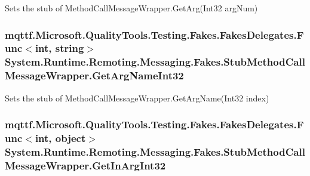 Sets the stub of Method\-Call\-Message\-Wrapper.\-Get\-Arg(\-Int32 arg\-Num)

\hypertarget{class_system_1_1_runtime_1_1_remoting_1_1_messaging_1_1_fakes_1_1_stub_method_call_message_wrapper_a0bc601441032eaa9484d346543abc3eb}{
\subsubsection[{Get\-Arg\-Name\-Int32}]{\setlength{\rightskip}{0pt plus 5cm}mqttf.\-Microsoft.\-Quality\-Tools.\-Testing.\-Fakes.\-Fakes\-Delegates.\-Func$<$int, string$>$ System.\-Runtime.\-Remoting.\-Messaging.\-Fakes.\-Stub\-Method\-Call\-Message\-Wrapper.\-Get\-Arg\-Name\-Int32}}\label{class_system_1_1_runtime_1_1_remoting_1_1_messaging_1_1_fakes_1_1_stub_method_call_message_wrapper_a0bc601441032eaa9484d346543abc3eb}


Sets the stub of Method\-Call\-Message\-Wrapper.\-Get\-Arg\-Name(\-Int32 index)

\hypertarget{class_system_1_1_runtime_1_1_remoting_1_1_messaging_1_1_fakes_1_1_stub_method_call_message_wrapper_ac3873c0ed7ba419030b9f453f2cfd1d2}{
\subsubsection[{Get\-In\-Arg\-Int32}]{\setlength{\rightskip}{0pt plus 5cm}mqttf.\-Microsoft.\-Quality\-Tools.\-Testing.\-Fakes.\-Fakes\-Delegates.\-Func$<$int, object$>$ System.\-Runtime.\-Remoting.\-Messaging.\-Fakes.\-Stub\-Method\-Call\-Message\-Wrapper.\-Get\-In\-Arg\-Int32}}\label{class_system_1_1_runtime_1_1_remoting_1_1_messaging_1_1_fakes_1_1_stub_method_call_message_wrapper_ac3873c0ed7ba419030b9f453f2cfd1d2}


